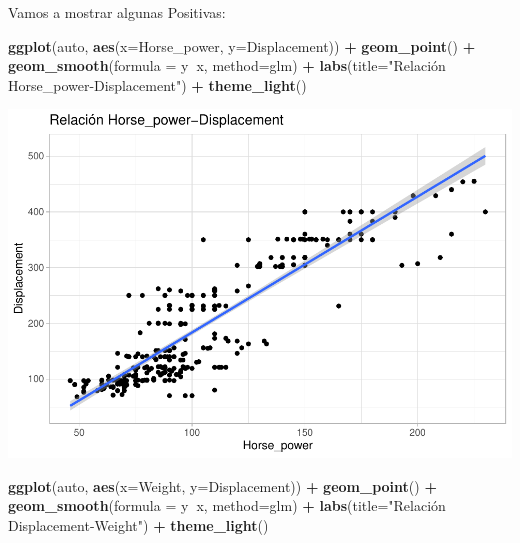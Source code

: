 \documentclass[
]{article}
\newenvironment{Shaded}{\begin{snugshade}}{\end{snugshade}}
\newcommand{\DataTypeTok}[1]{\textcolor[rgb]{0.13,0.29,0.53}{#1}}
\newcommand{\KeywordTok}[1]{\textcolor[rgb]{0.13,0.29,0.53}{\textbf{#1}}}
\newcommand{\NormalTok}[1]{#1}
\newcommand{\OperatorTok}[1]{\textcolor[rgb]{0.81,0.36,0.00}{\textbf{#1}}}
\newcommand{\StringTok}[1]{\textcolor[rgb]{0.31,0.60,0.02}{#1}}
\begin{document}
Vamos a mostrar algunas Positivas:

\begin{Shaded}
\begin{Highlighting}[]
\KeywordTok{ggplot}\NormalTok{(auto, }\KeywordTok{aes}\NormalTok{(}\DataTypeTok{x=}\NormalTok{Horse_power, }\DataTypeTok{y=}\NormalTok{Displacement)) }\OperatorTok{+}
\StringTok{  }\KeywordTok{geom_point}\NormalTok{() }\OperatorTok{+}
\StringTok{  }\KeywordTok{geom_smooth}\NormalTok{(}\DataTypeTok{formula =}\NormalTok{ y}\OperatorTok{~}\NormalTok{x, }\DataTypeTok{method=}\NormalTok{glm) }\OperatorTok{+}
\StringTok{  }\KeywordTok{labs}\NormalTok{(}\DataTypeTok{title=}\StringTok{"Relación Horse_power-Displacement"}\NormalTok{) }\OperatorTok{+}
\StringTok{  }\KeywordTok{theme_light}\NormalTok{()}
\end{Highlighting}
\end{Shaded}

\begin{center}\includegraphics{EDA_files/figure-latex/unnamed-chunk-21-1} \end{center}

\begin{Shaded}
\begin{Highlighting}[]
\KeywordTok{ggplot}\NormalTok{(auto, }\KeywordTok{aes}\NormalTok{(}\DataTypeTok{x=}\NormalTok{Weight, }\DataTypeTok{y=}\NormalTok{Displacement)) }\OperatorTok{+}
\StringTok{  }\KeywordTok{geom_point}\NormalTok{() }\OperatorTok{+}
\StringTok{  }\KeywordTok{geom_smooth}\NormalTok{(}\DataTypeTok{formula =}\NormalTok{ y}\OperatorTok{~}\NormalTok{x, }\DataTypeTok{method=}\NormalTok{glm) }\OperatorTok{+}
\StringTok{  }\KeywordTok{labs}\NormalTok{(}\DataTypeTok{title=}\StringTok{"Relación Displacement-Weight"}\NormalTok{) }\OperatorTok{+}
\StringTok{  }\KeywordTok{theme_light}\NormalTok{()}
\end{Highlighting}
\end{Shaded}
\end{document}
